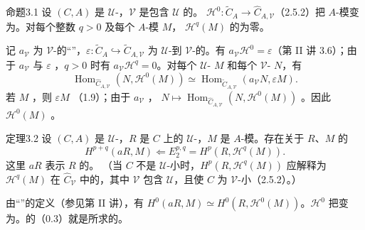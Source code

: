\begin{SGAresult}{命题}{3.1}
设 $(C,A)$ 是 $\mathcal U$-，$\mathcal V$ 是包含 $\mathcal U$ 的。 $\mathscr H^0:\widetilde C_A\to\widehat C_{A,\mathcal V}$（2.5.2）把 $A$-模变为。对每个整数 $q>0$ 及每个 $A$-模 $M$， $\mathscr H^q(M)$ 的为零。
\end{SGAresult}
记 $a_{\mathcal V}$ 为 $\mathcal V$-的“”，$\varepsilon:\widetilde C_A\hookrightarrow\widetilde C_{A,\mathcal V}$ 为 $\mathcal U$-到 $\mathcal V$-的。有 $a_{\mathcal V}\mathscr H^0=\varepsilon$（第 II 讲 3.6）；由于 $a_{\mathcal V}$ 与 $\varepsilon$ ，$q>0$ 时有 $a_{\mathcal V}\mathscr H^q=0$。对每个 $\mathcal U$- $M$ 和每个 $\mathcal V$- $N$，有
\[
 \operatorname{Hom}_{\widehat C_{A,\mathcal V}}(N,\mathscr H^0(M))
 \simeq\operatorname{Hom}_{\widetilde C_{A,\mathcal V}}(a_{\mathcal V}N,\varepsilon M).
\]
若 $M$ ，则 $\varepsilon M$ （1.9）；由于 $a_{\mathcal V}$ ， $N\mapsto\operatorname{Hom}_{\widehat C_{A,\mathcal V}}(N,\mathscr H^0(M))$ 。因此 $\mathscr H^0(M)$ 。
\begin{SGAresult}{定理}{3.2}
设 $(C,A)$ 是 $\mathcal U$-，$R$ 是 $C$ 上的 $\mathcal U$-，$M$ 是 $A$-模。存在关于 $R$、$M$ 的
\[
 H^{p+q}(aR,M)\Longleftarrow E_2^{p,q}=H^p(R,\mathscr H^q(M)).\tag{3.2.1}
\]
这里 $aR$ 表示 $R$ 的。
（当 $C$ 不是 $\mathcal U$-小时，$H^p(R,\mathscr H^q(M))$ 应解释为 $\mathscr H^q(M)$ 在 $\widehat C_{\mathcal V}$ 中的，其中 $\mathcal V$ 包含 $\mathcal U$，且使 $C$ 为 $\mathcal V$-小（2.5.2）。）
\end{SGAresult}
由“”的定义（参见第 II 讲），有 $H^0(aR,M)\simeq H^0(R,\mathscr H^0(M))$。$\mathscr H^0$ 把变为。的（0.3）就是所求的。

